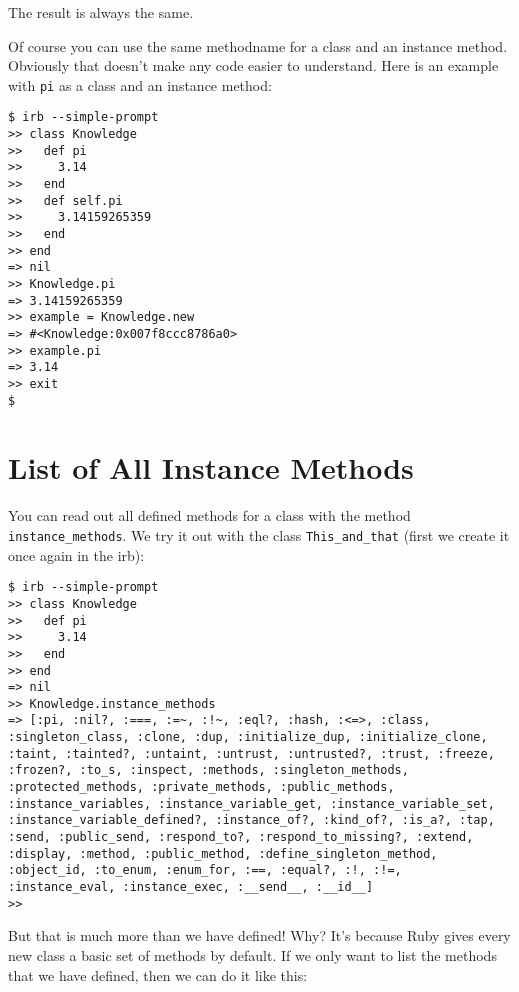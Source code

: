 \documentclass[a4paper]{book}
\begin{document}
The result is always the same.

Of course you can use the same methodname for a class and an instance method. Obviously that doesn't make any code easier to understand. Here is an example with \texttt{pi} as a class and an instance method:

\begin{shaded}\begin{verbatim}
$ irb --simple-prompt
>> class Knowledge
>>   def pi
>>     3.14
>>   end
>>   def self.pi
>>     3.14159265359
>>   end
>> end
=> nil
>> Knowledge.pi
=> 3.14159265359
>> example = Knowledge.new
=> #<Knowledge:0x007f8ccc8786a0>
>> example.pi
=> 3.14
>> exit
$
\end{verbatim}\end{shaded}

\section{List of All Instance Methods}\label{list-of-all-instance-methods}

You can read out all defined methods for a class with the method \texttt{instance\_methods}. We try it out with the class \texttt{This\_and\_that} (first we create it once again in the irb):

\begin{shaded}\begin{verbatim}
$ irb --simple-prompt
>> class Knowledge
>>   def pi
>>     3.14
>>   end
>> end
=> nil
>> Knowledge.instance_methods
=> [:pi, :nil?, :===, :=~, :!~, :eql?, :hash, :<=>, :class, :singleton_class, :clone, :dup, :initialize_dup, :initialize_clone, :taint, :tainted?, :untaint, :untrust, :untrusted?, :trust, :freeze, :frozen?, :to_s, :inspect, :methods, :singleton_methods, :protected_methods, :private_methods, :public_methods, :instance_variables, :instance_variable_get, :instance_variable_set, :instance_variable_defined?, :instance_of?, :kind_of?, :is_a?, :tap, :send, :public_send, :respond_to?, :respond_to_missing?, :extend, :display, :method, :public_method, :define_singleton_method, :object_id, :to_enum, :enum_for, :==, :equal?, :!, :!=, :instance_eval, :instance_exec, :__send__, :__id__]
>>
\end{verbatim}\end{shaded}

But that is much more than we have defined! Why? It's because Ruby gives every new class a basic set of methods by default. If we only want to list the methods that we have defined, then we can do it like this:
\end{document}
